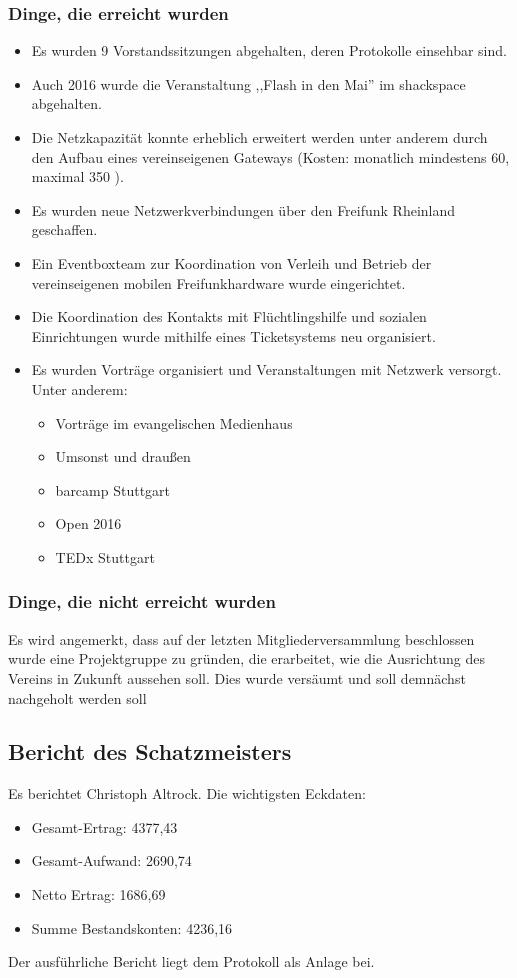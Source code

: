 \documentclass[a4paper]{scrartcl}
\begin{document}
\subsubsection{Dinge, die erreicht wurden}
\begin{itemize}
\item Es wurden 9 Vorstandssitzungen abgehalten, deren Protokolle einsehbar sind.
\item Auch 2016 wurde die Veranstaltung ,,Flash in den Mai'' im shackspace abgehalten.
\item Die Netzkapazität konnte erheblich erweitert werden unter anderem durch den Aufbau eines vereinseigenen Gateways (Kosten: monatlich mindestens 60, maximal 350 \texteuro).
\item Es wurden neue Netzwerkverbindungen über den Freifunk Rheinland geschaffen.
\item Ein Eventboxteam zur Koordination von Verleih und Betrieb der vereinseigenen mobilen Freifunkhardware wurde eingerichtet.
\item Die Koordination des Kontakts mit Flüchtlingshilfe und sozialen Einrichtungen wurde mithilfe eines Ticketsystems neu organisiert.
\item Es wurden Vorträge organisiert und Veranstaltungen mit Netzwerk versorgt. Unter anderem:
\begin{itemize}
\item Vorträge im evangelischen Medienhaus
\item Umsonst und draußen
\item  barcamp Stuttgart
\item  Open 2016
\item  TEDx Stuttgart
\end{itemize}
\end{itemize}
\subsubsection{Dinge, die nicht erreicht wurden}
Es wird angemerkt, dass auf der letzten Mitgliederversammlung beschlossen wurde eine Projektgruppe zu gründen, die erarbeitet, wie die Ausrichtung des Vereins in Zukunft aussehen soll. Dies wurde versäumt und soll demnächst nachgeholt werden soll
\subsection{Bericht des Schatzmeisters}
Es berichtet Christoph Altrock. Die wichtigsten Eckdaten:
\begin{itemize}
\item Gesamt-Ertrag: 4377,43 \texteuro
\item Gesamt-Aufwand: 2690,74 \texteuro
\item Netto Ertrag: 1686,69 \texteuro
\item Summe Bestandskonten: 4236,16 \texteuro
\end{itemize}
Der ausführliche Bericht liegt dem Protokoll als Anlage bei.
\end{document}
